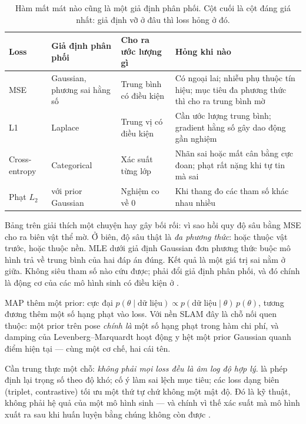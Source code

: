 \documentclass[../../../deep_learning.tex]{subfiles}
\begin{document}
\begin{table}[H]\centering\small
\caption{Hàm mất mát nào cũng là một giả định phân phối. Cột cuối là cột đáng giá nhất: giả định vỡ ở đâu thì loss hỏng ở đó.}
\label{tab:loss-tu-likelihood}
\begin{tabularx}{\linewidth}{@{}L{2.3cm}L{3.0cm}YL{3.9cm}@{}}
\toprule
\textbf{Loss} & \textbf{Giả định phân phối} & \textbf{Cho ra ước lượng gì} & \textbf{Hỏng khi nào}\\
\midrule
MSE & Gaussian, phương sai hằng số & Trung bình có điều kiện & Có ngoại lai; nhiễu phụ thuộc tín hiệu; mục tiêu đa phương thức thì cho ra trung bình mờ\\
L1 & Laplace & Trung vị có điều kiện & Cần ước lượng trung bình; gradient hằng số gây dao động gần nghiệm\\
Cross-entropy & Categorical & Xác suất từng lớp & Nhãn sai hoặc mất cân bằng cực đoan; phạt rất nặng khi tự tin mà sai\\
Phạt \(L_2\) &  với prior Gaussian & Nghiệm co về 0 & Khi thang đo các tham số khác nhau nhiều\\
\bottomrule
\end{tabularx}
\end{table}

Bảng trên giải thích một chuyện hay gây bối rối: vì sao hồi quy độ sâu bằng MSE cho ra biên vật thể mờ. Ở biên, độ sâu thật là \emph{đa phương thức}: hoặc thuộc vật trước, hoặc thuộc nền. MLE dưới giả định Gaussian đơn phương thức buộc mô hình trả về trung bình của hai đáp án đúng. Kết quả là một giá trị sai nằm ở giữa. Không siêu tham số nào cứu được; phải đổi giả định phân phối, và đó chính là động cơ của các mô hình sinh có điều kiện ở .


MAP thêm một prior: cực đại \(p(\theta\mid \text{dữ liệu}) \propto p(\text{dữ liệu}\mid\theta)\,p(\theta)\), tương đương thêm một số hạng phạt vào loss. Với nền SLAM đây là chỗ nối quen thuộc: một prior trên pose \emph{chính là} một số hạng phạt trong hàm chi phí, và damping của Levenberg--Marquardt hoạt động y hệt một prior Gaussian quanh điểm hiện tại --- cùng một cơ chế, hai cái tên.

Cần trung thực một chỗ: \emph{không phải mọi loss đều là âm log độ hợp lý}.  \cite{lin2017focal} là phép định lại trọng số theo độ khó;  \cite{szegedy2016rethinking} cố ý làm sai lệch mục tiêu; các loss dạng biên (triplet, contrastive) tối ưu một thứ tự chứ không một mật độ. Đó là kỹ thuật, không phải hệ quả của một mô hình sinh --- và chính vì thế xác suất mà mô hình xuất ra sau khi huấn luyện bằng chúng không còn được .
\end{document}
